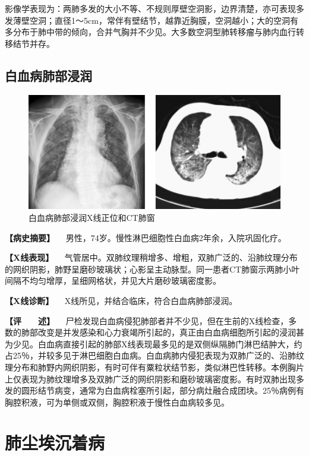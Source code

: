 影像学表现为：两肺多发的大小不等、不规则厚壁空洞影，边界清楚，亦可表现多发薄壁空洞；直径1～5cm，常伴有壁结节，越靠近胸膜，空洞越小；大的空洞有多分布于肺中带的倾向，合并气胸并不少见。大多数空洞型肺转移瘤与肺内血行转移结节并存。

\subsection{白血病肺部浸润}

\begin{figure}[!htbp]
 \centering
 \includegraphics{./images/Image00177.jpg}
 \captionsetup{justification=centering}
 \caption{白血病肺部浸润X线正位和CT肺窗}
 \label{fig3-8-15}
  \end{figure} 

\textbf{【病史摘要】}
　男性，74岁。慢性淋巴细胞性白血病2年余，入院巩固化疗。

\textbf{【X线表现】}
　气管居中。双肺纹理稍增多、增粗，双肺广泛的、沿肺纹理分布的网织阴影，肺野呈磨砂玻璃状；心影呈主动脉型。同一患者CT肺窗示两肺小叶间隔不均匀增厚，呈细网格状，并见大片磨砂玻璃密度影。

\textbf{【X线诊断】} 　X线所见，并结合临床，符合白血病肺部浸润。

\textbf{【评　　述】}
　尸检发现白血病侵犯肺部者并不少见，但在生前的X线检查，多数的肺部改变是并发感染和心力衰竭所引起的，真正由白血病细胞所引起的浸润甚为少见。白血病直接引起的肺部X线表现最多见的是双侧纵隔肺门淋巴结肿大，约占25％，并较多见于淋巴细胞白血病。白血病肺内侵犯表现为双肺广泛的、沿肺纹理分布和肺野内网织阴影，有时可伴有粟粒状结节影，类似淋巴性转移。本例胸片上仅表现为肺纹理增多及双肺广泛的网织阴影和磨砂玻璃密度影。有时双肺出现多发的圆形结节病变，通常为白血病栓塞所引起，部分病灶融合成团块。25％病例有胸腔积液，可为单侧或双侧，胸腔积液于慢性白血病较多见。

\section{肺尘埃沉着病}

